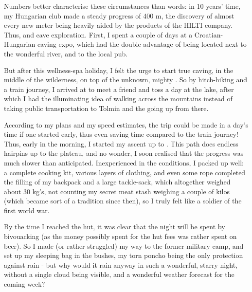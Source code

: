 Numbers better characterise these circumstances than words: in 10 years'
time, my Hungarian club made a steady progress of 400 m, the discovery
of almost every new meter being heavily aided by the products of the
HILTI company. Thus,  and cave exploration. First, I spent a couple of days at a
Croatian-Hungarian caving expo, which had the double advantage of being
located next to the wonderful  river, and to the local pub.

But after this wellness-spa holiday, I felt the urge to start true
caving, in the middle of the wilderness, on top of the unknown, mighty
. So by hitch-hiking and a train journey, I arrived at  to meet a friend and toss a day at the lake, after which I had
the illuminating idea of walking across the mountains instead of taking
public transportation to Tolmin and the going up from there.

According to my plans and my speed estimates, the trip could be made in
a day's time if one started early, thus even saving time compared to the
train journey! Thus, early in the morning, I started my ascent up to . This path does endless hairpins up to the plateau, and no
wonder, I soon realised that the progress was much slower than
anticipated. Inexperienced in the  conditions, I packed up well:
a complete cooking kit, various layers of clothing, and even some rope
completed the filling of my backpack and a large tackle-sack, which
altogether weighed about 30 kg's, not counting my secret meat stash
weighing a couple of kilos (which became sort of a tradition since
then), so I truly felt like a soldier of the first world war.

By the time I reached the hut, it was clear that the night will be spent
by bivouacking (as the money possibly spent for the hut fees was rather
spent on beer). So I made (or rather struggled) my way to the former
military camp, and set up my sleeping bag in the bushes, my torn poncho
being the only protection against rain - but why would it rain anyway in
such a wonderful, starry night, without a single cloud being visible,
and a wonderful weather forecast for the coming week?

